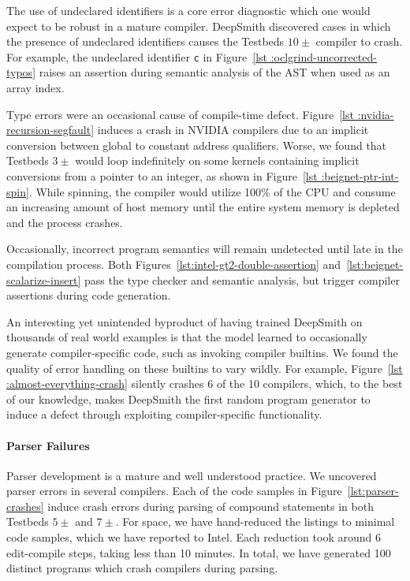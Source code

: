 The use of undeclared identifiers is a core error diagnostic which one would
expect to be robust in a mature compiler. DeepSmith discovered cases in which
the presence of undeclared identifiers causes the Testbeds $10\pm$ compiler to
crash. For example, the undeclared identifier \texttt{c} in Figure~\ref{lst
:oclgrind-uncorrected-typos} raises an assertion during semantic analysis of the
AST when used as an array index.

Type errors were an occasional cause of compile-time defect. Figure~\ref{lst
:nvidia-recursion-segfault} induces a crash in NVIDIA compilers due to an
implicit conversion between global to constant address qualifiers. Worse, we
found that Testbeds $3\pm$ would loop indefinitely on some kernels containing
implicit conversions from a pointer to an integer, as shown in Figure~\ref{lst
:beignet-ptr-int-spin}. While spinning, the compiler would utilize 100\% of the
CPU and consume an increasing amount of host memory until the entire system
memory is depleted and the process crashes.

Occasionally, incorrect program semantics will remain undetected until late in
the compilation process. Both Figures~\ref{lst:intel-gt2-double-assertion}
and~\ref{lst:beignet-scalarize-insert} pass the type checker and semantic
analysis, but trigger compiler assertions during code generation.

An interesting yet unintended byproduct of having trained DeepSmith on thousands
of real world examples is that the model learned to occasionally generate
compiler-specific code, such as invoking compiler builtins. We found the quality
of error handling on these builtins to vary wildly. For example, Figure~\ref{lst
:almost-everything-crash} silently crashes 6 of the 10 compilers, which, to the
best of our knowledge, makes DeepSmith the first random program generator to
induce a defect through exploiting compiler-specific functionality.

\paragraph{Parser Failures}

Parser development is a mature and well understood practice. We uncovered parser
errors in several compilers. Each of the code samples in Figure~\ref{lst:parser-
crashes} induce crash errors during parsing of compound statements in both
Testbeds $5\pm$ and $7\pm$. For space, we have hand-reduced the listings to
minimal code samples, which we have reported to Intel. Each reduction took
around 6 edit-compile steps, taking less than 10 minutes. In total, we have
generated 100 distinct programs which crash compilers during parsing.

